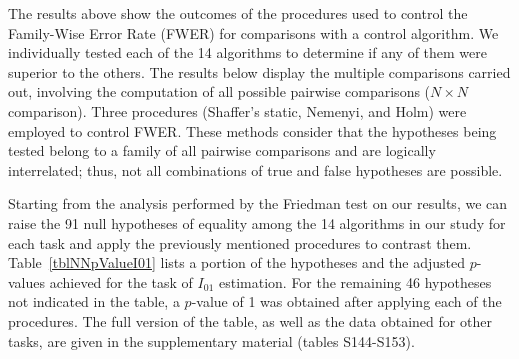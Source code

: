 \documentclass[a4paper,fleqn]{cas-sc}
\begin{document}
The results above show the outcomes of the procedures used to control the Family-Wise Error Rate (FWER)
for comparisons with a control algorithm.
We individually tested each of the 14 algorithms to determine if any of them were superior to the others.
The results below display the multiple comparisons carried out,
involving the computation of all possible pairwise comparisons ($N\times N$ comparison).
Three procedures (Shaffer’s static, Nemenyi, and Holm) were employed to control FWER.
These methods consider that the hypotheses being tested belong to a family of all
pairwise comparisons and are logically interrelated; thus,
not all combinations of true and false hypotheses are possible.

Starting from the analysis performed by the Friedman test on our results,
we can raise the 91 null hypotheses of equality among
the 14 algorithms in our study for each task and apply the previously mentioned procedures to contrast them.
Table~\ref{tblNNpValueI01} lists a portion of the hypotheses and the
adjusted $p$-values achieved for the task of $I_{01}$ estimation.
For the remaining 46 hypotheses not indicated in the table,
a $p$-value of 1 was obtained after applying each of the procedures.
The full version of the table, as well as the data obtained for other tasks,
are given in the supplementary material (tables S144-S153).
\end{document}
